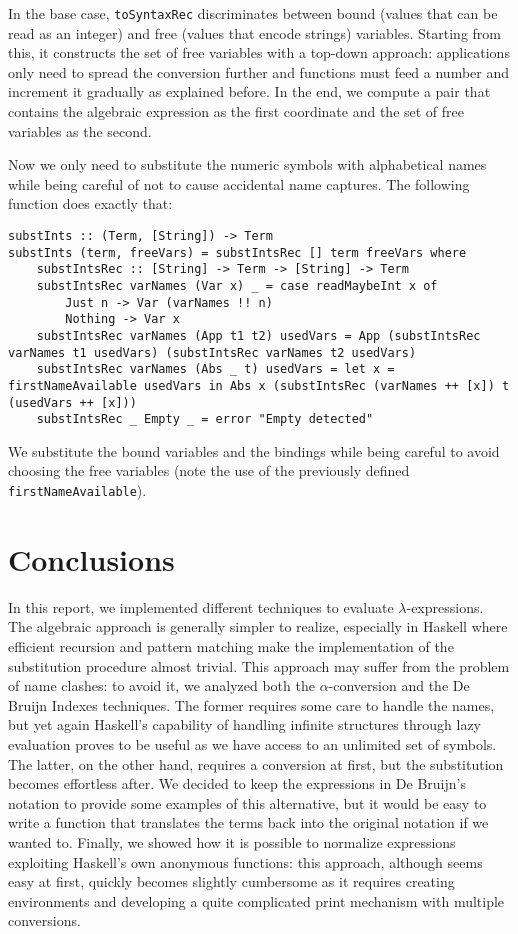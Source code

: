 \documentclass{article}
\begin{document}
In the base case, \lstinline|toSyntaxRec| discriminates between bound (values that can be read as an integer) and free (values that encode strings) variables. Starting from this, it constructs the set of free variables with a top-down approach: applications only need to spread the conversion further and functions must feed a number and increment it gradually as explained before. In the end, we compute a pair that contains the algebraic expression as the first coordinate and the set of free variables as the second.

Now we only need to substitute the numeric symbols with alphabetical names while being careful of not to cause accidental name captures. The following function does exactly that:

\begin{lstlisting}
substInts :: (Term, [String]) -> Term
substInts (term, freeVars) = substIntsRec [] term freeVars where
    substIntsRec :: [String] -> Term -> [String] -> Term
    substIntsRec varNames (Var x) _ = case readMaybeInt x of
        Just n -> Var (varNames !! n)
        Nothing -> Var x
    substIntsRec varNames (App t1 t2) usedVars = App (substIntsRec varNames t1 usedVars) (substIntsRec varNames t2 usedVars)
    substIntsRec varNames (Abs _ t) usedVars = let x = firstNameAvailable usedVars in Abs x (substIntsRec (varNames ++ [x]) t (usedVars ++ [x]))
    substIntsRec _ Empty _ = error "Empty detected"
\end{lstlisting}

We substitute the bound variables and the bindings while being careful to avoid choosing the free variables (note the use of the previously defined \lstinline|firstNameAvailable|).

\section{Conclusions}\label{sec:conclusions}

In this report, we implemented different techniques to evaluate $\lambda$-expressions. The algebraic approach is generally simpler to realize, especially in Haskell where efficient recursion and pattern matching make the implementation of the substitution procedure almost trivial. This approach may suffer from the problem of name clashes: to avoid it, we analyzed both the $\alpha$-conversion and the De Bruijn Indexes techniques. The former requires some care to handle the names, but yet again Haskell's capability of handling infinite structures through lazy evaluation proves to be useful as we have access to an unlimited set of symbols. The latter, on the other hand, requires a conversion at first, but the substitution becomes effortless after. We decided to keep the expressions in De Bruijn's notation to provide some examples of this alternative, but it would be easy to write a function that translates the terms back into the original notation if we wanted to. Finally, we showed how it is possible to normalize expressions exploiting Haskell's own anonymous functions: this approach, although seems easy at first, quickly becomes slightly cumbersome as it requires creating environments and developing a quite complicated print mechanism with multiple conversions.
\end{document}
